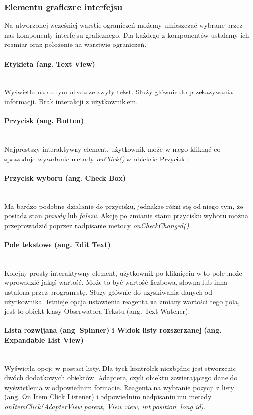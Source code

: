 \subsubsection{Elementu graficzne interfejsu}
Na utworzonej wcześniej warstie ograniczeń możemy umieszczać wybrane przez nas komponenty interfejsu graficznego. Dla każdego z komponentów ustalamy ich rozmiar oraz położenie na warstwie ograniczeń.
\paragraph{Etykieta (ang. Text View)}\mbox{}\\
Wyświetla na danym obszarze zwyły tekst. Służy głównie do przekazywania informacji. Brak interakcji z użytkownikiem.\cite{textview}
\paragraph{Przycisk (ang. Button)}\mbox{}\\
Najprostszy interaktywny element, użytkownik może w niego kliknąć co spowoduje wywołanie metody \textit{onClick()} w obiekcie Przycisku. \cite{button}
\paragraph{Przycisk wyboru (ang. Check Box)}\mbox{}\\
Ma bardzo podobne działanie do przycisku, jednakże różni się od niego tym, że posiada stan \textit{prawdy} lub \textit{fałszu}. Akcję po zmianie stanu przycisku wyboru można przeprowadzić poprzez nadpisanie metody \textit{onCheckChanged()}.
\paragraph{Pole tekstowe (ang. Edit Text)}\mbox{}\\
Kolejny prosty interaktywny element, użytkownik po kliknięciu w to pole może wprowadzić jakąś wartość. Może to być wartość liczbowa, słowna lub inna ustalona przez programistę. Służy głównie do uzyskiwania danych od użytkownika. Istnieje opcja ustawienia reagenta na zmiany wartości tego pola, jest to obiekt klasy Obserwatora Tekstu (ang. Text Watcher).\cite{edittext}
\paragraph{Lista rozwijana (ang. Spinner) i Widok listy rozszerzanej (ang. Expandable List View)}\mbox{}\\
Wyświetla opcje w postaci listy. Dla tych kontrolek niezbędne jest stworzenie dwóch dodatkowych obiektów. Adaptera, czyli obiektu zawierającego dane do wyświetlenia w odpowiednim formacie. Reagenta na wybranie pozycji z listy (ang. On Item Click Listener) i odpowiednim nadpisaniu mu metody \textit{onItemClick(AdapterView parent, View view, int position, long id)}.\cite{adapterview}
